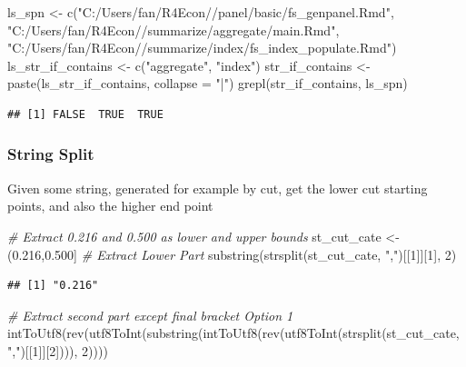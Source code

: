 \documentclass[
]{book}
\newenvironment{Shaded}{\begin{snugshade}}{\end{snugshade}}
\newcommand{\AttributeTok}[1]{\textcolor[rgb]{0.77,0.63,0.00}{#1}}
\newcommand{\CommentTok}[1]{\textcolor[rgb]{0.56,0.35,0.01}{\textit{#1}}}
\newcommand{\DecValTok}[1]{\textcolor[rgb]{0.00,0.00,0.81}{#1}}
\newcommand{\FunctionTok}[1]{\textcolor[rgb]{0.00,0.00,0.00}{#1}}
\newcommand{\NormalTok}[1]{#1}
\newcommand{\OtherTok}[1]{\textcolor[rgb]{0.56,0.35,0.01}{#1}}
\newcommand{\StringTok}[1]{\textcolor[rgb]{0.31,0.60,0.02}{#1}}
\begin{document}
\begin{Shaded}
\begin{Highlighting}[]
\NormalTok{ls\_spn }\OtherTok{\textless{}{-}} \FunctionTok{c}\NormalTok{(}\StringTok{"C:/Users/fan/R4Econ//panel/basic/fs\_genpanel.Rmd"}\NormalTok{,}
            \StringTok{"C:/Users/fan/R4Econ//summarize/aggregate/main.Rmd"}\NormalTok{,}
            \StringTok{"C:/Users/fan/R4Econ//summarize/index/fs\_index\_populate.Rmd"}\NormalTok{)}
\NormalTok{ls\_str\_if\_contains }\OtherTok{\textless{}{-}} \FunctionTok{c}\NormalTok{(}\StringTok{"aggregate"}\NormalTok{, }\StringTok{"index"}\NormalTok{)}
\NormalTok{str\_if\_contains }\OtherTok{\textless{}{-}} \FunctionTok{paste}\NormalTok{(ls\_str\_if\_contains, }\AttributeTok{collapse =} \StringTok{"|"}\NormalTok{)}
\FunctionTok{grepl}\NormalTok{(str\_if\_contains, ls\_spn)}
\end{Highlighting}
\end{Shaded}

\begin{verbatim}
## [1] FALSE  TRUE  TRUE
\end{verbatim}

\hypertarget{string-split}{%
\subsubsection{String Split}\label{string-split}}

Given some string, generated for example by cut, get the lower cut starting points, and also the higher end point

\begin{Shaded}
\begin{Highlighting}[]
\CommentTok{\# Extract 0.216 and 0.500 as lower and upper bounds}
\NormalTok{st\_cut\_cate }\OtherTok{\textless{}{-}} \StringTok{\textquotesingle{}(0.216,0.500]\textquotesingle{}}
\CommentTok{\# Extract Lower Part}
\FunctionTok{substring}\NormalTok{(}\FunctionTok{strsplit}\NormalTok{(st\_cut\_cate, }\StringTok{","}\NormalTok{)[[}\DecValTok{1}\NormalTok{]][}\DecValTok{1}\NormalTok{], }\DecValTok{2}\NormalTok{)}
\end{Highlighting}
\end{Shaded}

\begin{verbatim}
## [1] "0.216"
\end{verbatim}

\begin{Shaded}
\begin{Highlighting}[]
\CommentTok{\# Extract second part except final bracket Option 1}
\FunctionTok{intToUtf8}\NormalTok{(}\FunctionTok{rev}\NormalTok{(}\FunctionTok{utf8ToInt}\NormalTok{(}\FunctionTok{substring}\NormalTok{(}\FunctionTok{intToUtf8}\NormalTok{(}\FunctionTok{rev}\NormalTok{(}\FunctionTok{utf8ToInt}\NormalTok{(}\FunctionTok{strsplit}\NormalTok{(st\_cut\_cate, }\StringTok{","}\NormalTok{)[[}\DecValTok{1}\NormalTok{]][}\DecValTok{2}\NormalTok{]))), }\DecValTok{2}\NormalTok{))))}
\end{Highlighting}
\end{Shaded}
\end{document}
